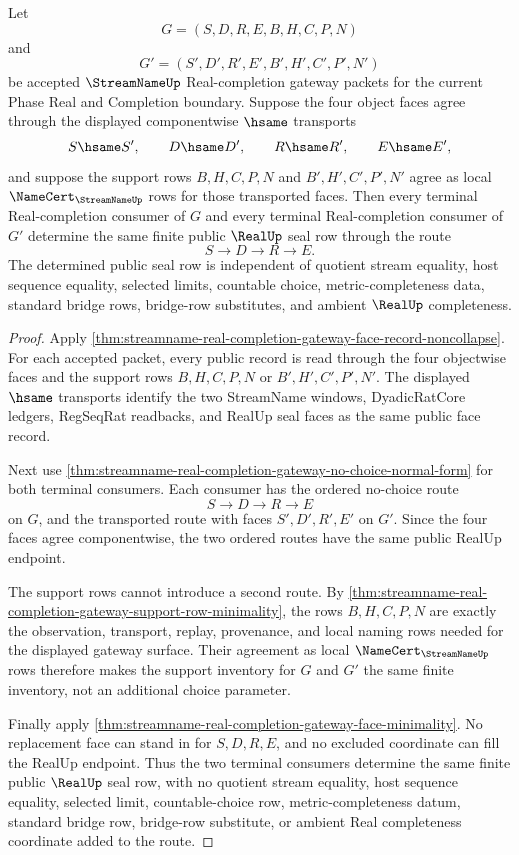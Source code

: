 \begin{theorem}
\label{thm:streamname-real-completion-gateway-choice-free-face-determinacy}
Let
$$
G=(S,D,R,E,B,H,C,P,N)
$$
and
$$
G'=(S',D',R',E',B',H',C',P',N')
$$
be accepted $\StreamNameUp$ Real-completion gateway packets for the current Phase Real and Completion boundary. Suppose the four object faces agree through the displayed componentwise $\hsame$ transports
$$
S \hsame S',
\qquad
D \hsame D',
\qquad
R \hsame R',
\qquad
E \hsame E',
$$
and suppose the support rows $B,H,C,P,N$ and $B',H',C',P',N'$ agree as local $\NameCert_{\StreamNameUp}$ rows for those transported faces. Then every terminal Real-completion consumer of $G$ and every terminal Real-completion consumer of $G'$ determine the same finite public $\RealUp$ seal row through the route
$$
S \longrightarrow D \longrightarrow R \longrightarrow E .
$$
The determined public seal row is independent of quotient stream equality, host sequence equality, selected limits, countable choice, metric-completeness data, standard bridge rows, bridge-row substitutes, and ambient $\RealUp$ completeness.
\end{theorem}
\begin{proof}
Apply \autoref{thm:streamname-real-completion-gateway-face-record-noncollapse}. For each accepted packet, every public record is read through the four objectwise faces and the support rows $B,H,C,P,N$ or $B',H',C',P',N'$. The displayed $\hsame$ transports identify the two StreamName windows, DyadicRatCore ledgers, RegSeqRat readbacks, and RealUp seal faces as the same public face record.

Next use \autoref{thm:streamname-real-completion-gateway-no-choice-normal-form} for both terminal consumers. Each consumer has the ordered no-choice route
$$
S \longrightarrow D \longrightarrow R \longrightarrow E
$$
on $G$, and the transported route with faces $S',D',R',E'$ on $G'$. Since the four faces agree componentwise, the two ordered routes have the same public RealUp endpoint.

The support rows cannot introduce a second route. By \autoref{thm:streamname-real-completion-gateway-support-row-minimality}, the rows $B,H,C,P,N$ are exactly the observation, transport, replay, provenance, and local naming rows needed for the displayed gateway surface. Their agreement as local $\NameCert_{\StreamNameUp}$ rows therefore makes the support inventory for $G$ and $G'$ the same finite inventory, not an additional choice parameter.

Finally apply \autoref{thm:streamname-real-completion-gateway-face-minimality}. No replacement face can stand in for $S,D,R,E$, and no excluded coordinate can fill the RealUp endpoint. Thus the two terminal consumers determine the same finite public $\RealUp$ seal row, with no quotient stream equality, host sequence equality, selected limit, countable-choice row, metric-completeness datum, standard bridge row, bridge-row substitute, or ambient Real completeness coordinate added to the route.
\end{proof}


